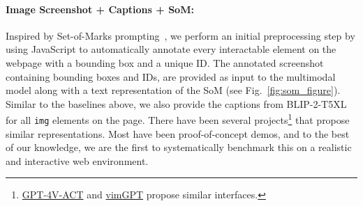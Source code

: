 \paragraph{Image Screenshot + Captions + SoM:} Inspired by Set-of-Marks prompting~\cite{yang2023som}, we perform an initial preprocessing step by using JavaScript to automatically annotate every interactable element on the webpage with a bounding box and a unique ID. The annotated screenshot containing bounding boxes and IDs, are provided as input to the multimodal model along with a text representation of the SoM (see Fig.~\ref{fig:som_figure}). Similar to the baselines above, we also provide the captions from BLIP-2-T5XL for all \texttt{img} elements on the page. There have been several projects\footnote{\href{https://github.com/ddupont808/GPT-4V-Act}{GPT-4V-ACT} and \href{https://github.com/ishan0102/vimGPT}{vimGPT} propose similar interfaces.} that propose similar representations. Most have been proof-of-concept demos, and to the best of our knowledge, we are the first to systematically benchmark this on a realistic and interactive web environment. %


